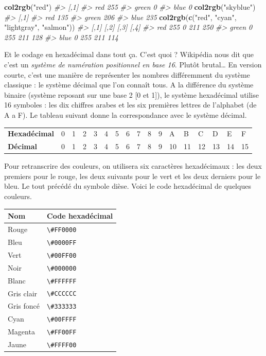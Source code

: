 \documentclass[]{article}
\newenvironment{Shaded}{\begin{snugshade}}{\end{snugshade}}
\newcommand{\CommentTok}[1]{\textcolor[rgb]{0.56,0.35,0.01}{\textit{#1}}}
\newcommand{\KeywordTok}[1]{\textcolor[rgb]{0.13,0.29,0.53}{\textbf{#1}}}
\newcommand{\NormalTok}[1]{#1}
\newcommand{\StringTok}[1]{\textcolor[rgb]{0.31,0.60,0.02}{#1}}
\begin{document}
\begin{Shaded}
\begin{Highlighting}[]
\KeywordTok{col2rgb}\NormalTok{(}\StringTok{"red"}\NormalTok{)}
\CommentTok{#>       [,1]}
\CommentTok{#> red    255}
\CommentTok{#> green    0}
\CommentTok{#> blue     0}
\KeywordTok{col2rgb}\NormalTok{(}\StringTok{"skyblue"}\NormalTok{)}
\CommentTok{#>       [,1]}
\CommentTok{#> red    135}
\CommentTok{#> green  206}
\CommentTok{#> blue   235}
\KeywordTok{col2rgb}\NormalTok{(}\KeywordTok{c}\NormalTok{(}\StringTok{"red"}\NormalTok{, }\StringTok{"cyan"}\NormalTok{, }\StringTok{"lightgray"}\NormalTok{, }\StringTok{"salmon"}\NormalTok{))}
\CommentTok{#>       [,1] [,2] [,3] [,4]}
\CommentTok{#> red    255    0  211  250}
\CommentTok{#> green    0  255  211  128}
\CommentTok{#> blue     0  255  211  114}
\end{Highlighting}
\end{Shaded}

Et le codage en hexadécimal dans tout ça. C'est quoi ? Wikipédia nous dit que c'est un \emph{système de numération positionnel en base 16}. Plutôt brutal\ldots{} En version courte, c'est une manière de représenter les nombres différemment du système classique : le système décimal que l'on connaît tous.
A la différence du système binaire (système reposant sur une base 2 {[}0 et 1{]}), le système hexadécimal utilise 16 symboles : les dix chiffres arabes et les six premières lettres de l'alphabet (de A a F). Le tableau suivant donne la correspondance avec le système décimal.

\begin{longtable}[]{@{}lllllllllllllllll@{}}
\toprule
\endhead
\textbf{Hexadécimal} & 0 & 1 & 2 & 3 & 4 & 5 & 6 & 7 & 8 & 9 & A & B & C & D & E & F\tabularnewline
\textbf{Décimal} & 0 & 1 & 2 & 3 & 4 & 5 & 6 & 7 & 8 & 9 & 10 & 11 & 12 & 13 & 14 & 15\tabularnewline
\bottomrule
\end{longtable}

Pour retranscrire des couleurs, on utilisera six caractères hexadécimaux : les deux premiers pour le rouge, les deux suivants pour le vert et les deux derniers pour le bleu. Le tout précédé du symbole dièse. Voici le code hexadécimal de quelques couleurs.

\begin{longtable}[]{@{}ll@{}}
\toprule
\textbf{Nom} & \textbf{Code hexadécimal}\tabularnewline
\midrule
\endhead
Rouge & \texttt{\textbackslash{}\#FF0000}\tabularnewline
Bleu & \texttt{\textbackslash{}\#0000FF}\tabularnewline
Vert & \texttt{\textbackslash{}\#00FF00}\tabularnewline
Noir & \texttt{\textbackslash{}\#000000}\tabularnewline
Blanc & \texttt{\textbackslash{}\#FFFFFF}\tabularnewline
Gris clair & \texttt{\textbackslash{}\#CCCCCC}\tabularnewline
Gris foncé & \texttt{\textbackslash{}\#333333}\tabularnewline
Cyan & \texttt{\textbackslash{}\#00FFFF}\tabularnewline
Magenta & \texttt{\textbackslash{}\#FF00FF}\tabularnewline
Jaune & \texttt{\textbackslash{}\#FFFF00}\tabularnewline
\bottomrule
\end{longtable}
\end{document}
